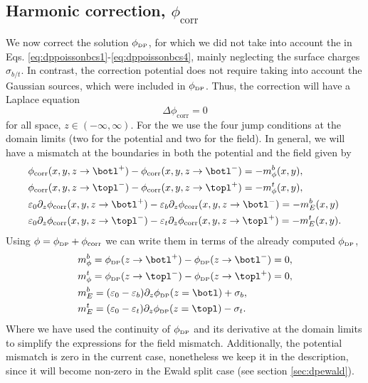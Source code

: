 \documentclass[twoside,openright,titlepage,numbers=noenddot,%
headinclude,footinclude,cleardoublepage=empty,abstract=on,
BCOR=5mm,fontsize=11pt, dvipsnames, paper=b5
]{scrreprt}
\newcommand{\corr}{\text{corr}}
\newcommand{\dpr}{\text{\tiny DP}}
\begin{document}
\subsection{Harmonic correction, $\phi_{\corr}$}\label{sec:dpcorr}
We now correct the solution $\phi_{\dpr}$, for which we did not take into account the \bcs in Eqs. \eqref{eq:dppoissonbcs1}-\eqref{eq:dppoissonbcs4}, mainly neglecting the surface charges $\sigma_{b/t}$. In contrast, the correction potential does not require taking into account the Gaussian sources, which were included in $\phi_{\dpr}$. Thus, the correction will have a Laplace equation
\begin{equation}
  \label{eq:dppoissonlaplacecorr}
  \Delta \phi_{\corr} = 0
\end{equation}
for all space, $z\in(-\infty, \infty)$. For the \bcs we use the four jump conditions at the domain limits (two for the potential and two for the field). In general, we will have a mismatch at the boundaries in both the potential and the field given by
\begin{equation}
  \label{eq:dppoissonmismatchcorr}
  \begin{aligned}
    &\phi_{\corr}(x,y,z\rightarrow \botl^+) - \phi_{\corr}(x,y,z\rightarrow \botl^-) = -m_{\phi}^{b}(x,y),\\
    &\phi_{\corr}(x,y,z\rightarrow \topl^-) - \phi_{\corr}(x,y,z\rightarrow \topl^+) = -m_{\phi}^{t}(x,y),\\
    &\varepsilon_0\partial_z\phi_{\corr}(x,y,z\rightarrow \botl^+) - \varepsilon_{b}\partial_z\phi_{\corr}(x,y,z\rightarrow \botl^-) = -m_E^{b}(x,y)\\
    &\varepsilon_0\partial_z\phi_{\corr}(x,y,z\rightarrow \topl^-) - \varepsilon_{t}\partial_z\phi_{\corr}(x,y,z\rightarrow \topl^+) = -m_E^{t}(x,y).
  \end{aligned}
\end{equation}
Using $\phi = \phi_{\dpr} + \phi_{\corr}$ we can write them in terms of the already computed $\phi_{\dpr}$, 
\begin{equation}
  \begin{aligned}
    &m_{\phi}^{b} = \phi_{\dpr}(z\rightarrow \botl^+) - \phi_{\dpr}(z\rightarrow \botl^-) = 0,\\
    &m_{\phi}^{t} = \phi_{\dpr}(z\rightarrow \topl^-) - \phi_{\dpr}(z\rightarrow \topl^+) = 0,\\
    &m_E^{b} = (\varepsilon_0 - \varepsilon_{b})\partial_z\phi_{\dpr}(z=\botl) + \sigma_{b},\\
    &m_E^{t} = (\varepsilon_0 - \varepsilon_{t})\partial_z\phi_{\dpr}(z=\topl) - \sigma_{t}.
  \end{aligned}
\end{equation}
Where we have used the continuity of $\phi_{\dpr}$ and its derivative at the domain limits to simplify the expressions for the field mismatch. Additionally, the potential mismatch is zero in the current case, nonetheless we keep it in the description, since it will become non-zero in the Ewald split case (see section \ref{sec:dpewald}).
\end{document}
